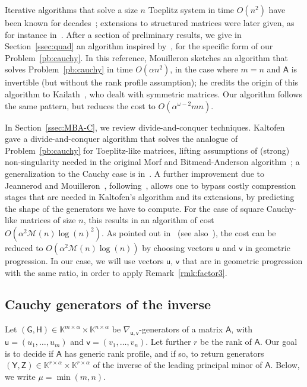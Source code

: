 \documentclass[sigconf]{acmart}
\newcommand{\vu}{\ensuremath{\mathsf{u}}}
\newcommand{\vv}{\ensuremath{\mathsf{v}}}
\newcommand{\mA}{\ensuremath{\mathsf{A}}}
\newcommand{\mG}{\ensuremath{\mathsf{G}}}
\newcommand{\mH}{\ensuremath{\mathsf{H}}}
\newcommand{\mY}{\ensuremath{\mathsf{Y}}}
\newcommand{\mZ}{\ensuremath{\mathsf{Z}}}
\newcommand{\K}{\ensuremath{\mathbb{K}}}
\newcommand{\M}{\ensuremath{\mathscr{M}}}
\newcommand{\mn}{\ensuremath{\mu}}
\theoremstyle{acmdefinition}
\begin{document}
Iterative algorithms that solve a size $n$ Toeplitz system in time
$O(n^2)$ have been known for
decades~\cite{Levinson47,Durbin60,Trench64}; extensions to structured
matrices were later given, as for instance in~\cite{KaGoOl95}. After a
section of preliminary results, we give in Section~\ref{ssec:quad} an
algorithm inspired by~\cite[Algorithme~4]{Mouilleron08}, for the
specific form of our Problem~\ref{pb:cauchy}. In this reference,
Mouilleron sketches an algorithm that solves Problem~\ref{pb:cauchy}
in time $O(\alpha n^2)$, in the case where $m=n$ and $\mA$ is
invertible (but without the rank profile assumption); he credits the
origin of this algorithm to Kailath~\cite[\S1.10]{KaSa99}, who dealt
with symmetric matrices.  Our algorithm follows the same pattern, but
reduces the cost to $O(\alpha^{\omega-2} mn)$.

In Section~\ref{ssec:MBA-C}, we review divide-and-conquer
techniques. Kalt\-ofen~\cite{Kaltofen94} gave a divide-and-conquer
algorithm that solves the analogue of Problem~\ref{pb:cauchy} for
Toeplitz-like matrices, lifting assumptions of (strong)
non-singularity needed in the original Morf and Bitmead-Anderson
algorithm~\cite{Morf80,BiAn80}; a generalization to the Cauchy case is
in~\cite{PaZh00,Cardinal99}.  A further improvement due to Jeannerod
and Mouilleron~\cite{JeMo10}, following~\cite{Cardinal99}, allows one
to bypass costly compression stages that are needed in Kaltofen's
algorithm and its extensions, by predicting the shape of the
generators we have to compute. For the case of square Cauchy-like
matrices of size $n$, this results in an algorithm of cost
$O(\alpha^2 \M(n)\log(n)^2)$. As pointed out
in~\cite[Theorem~5.3.1]{Pan01} (see also~\cite{ChPa00}), the cost can
be reduced to $O(\alpha^2 \M(n)\log(n))$ by choosing vectors $\vu$ and
$\vv$ in geometric progression. In our case, we will use vectors
$\vu$, $\vv$ that are in geometric progression with the same ratio, in
order to apply Remark~\ref{rmk:factor3}.


\vspace{-5px}
\subsection{Cauchy generators of the inverse}\label{ssec:genofinv}

Let $(\mG,\mH) \in \K^{m\times \alpha} \times \K^{n\times \alpha}$ be
$\nabla_{\vu,\vv}$-generators of a matrix $\mA$, with
$\vu=(u_1,\dots,u_m)$ and $\vv=(v_1,\dots,v_n)$. Let further $r$ be
the rank of $\mA$. Our goal is to decide if $\mA$ has generic rank
profile, and if so, to return generators
$(\mY,\mZ) \in \K^{r\times \alpha} \times \K^{r\times \alpha}$ of the
inverse of the leading principal minor of $\mA$.  Below, we write
$\mn=\min(m,n)$.
\end{document}
